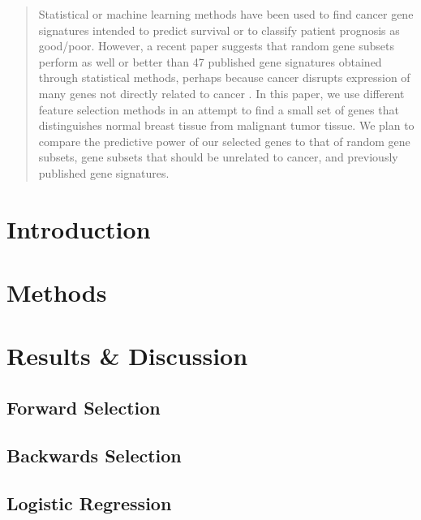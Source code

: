 \documentclass[11pt]{article}
\begin{document}
\maketitle

\begin{abstract}
Statistical or machine learning methods have been used to find cancer gene signatures intended to predict survival or to classify patient prognosis as good/poor. However, a recent paper suggests that random gene subsets perform as well or better than 47 published gene signatures obtained through statistical methods, perhaps because cancer disrupts expression of many genes not directly related to cancer \cite{venet}. In this paper, we use different feature selection methods in an attempt to find a small set of genes that distinguishes normal breast tissue from malignant tumor tissue. We plan to compare the predictive power of our selected genes to that of random gene subsets, gene subsets that should be unrelated to cancer, and previously published gene signatures.
\end{abstract}

\section{Introduction}

\section{Methods}


\section{Results \& Discussion}

\subsection{Forward Selection}
\subsection{Backwards Selection}
\subsection{Logistic Regression}
\end{document}
